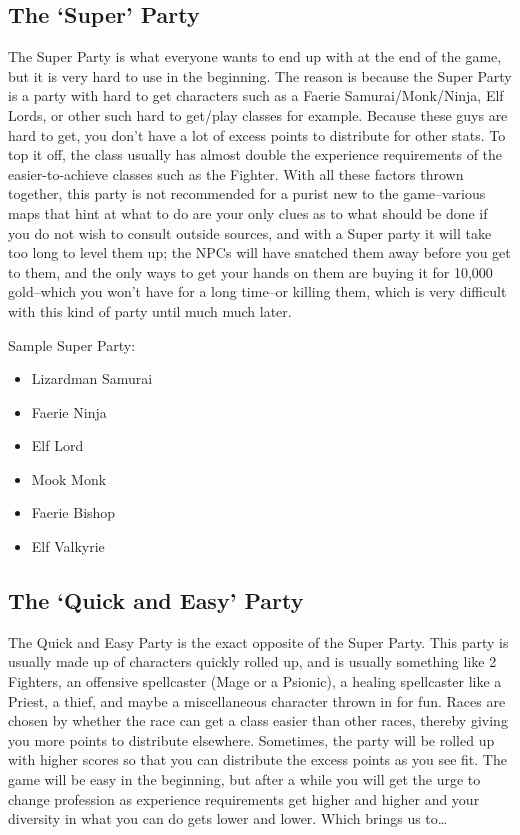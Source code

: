 \documentclass[12pt]{article}
\providecommand{\tightlist}{%
  \setlength{\itemsep}{0pt}\setlength{\parskip}{0pt}}
\begin{document}
\subsection{\texorpdfstring{The `Super'
Party}{The Super Party}}\label{the-super-party}

The Super Party is what everyone wants to end up with at the end of the game,
but it is very hard to use in the beginning. The reason is because the Super
Party is a party with hard to get characters such as a Faerie
Samurai\fshyp{}Monk\fshyp{}Ninja, Elf Lords, or other such hard to get/play
classes for example. Because these guys are hard to get, you don't have a lot
of excess points to distribute for other stats. To top it off, the class
usually has almost double the experience requirements of the
easier-to-achieve classes such as the Fighter. With all these factors thrown
together, this party is not recommended for a purist new to the game--various
maps that hint at what to do are your only clues as to what should be done if
you do not wish to consult outside sources, and with a Super party it will
take too long to level them up; the NPCs will have snatched them away before
you get to them, and the only ways to get your hands on them are buying it
for 10,000 gold--which you won't have for a long time--or killing them, which
is very difficult with this kind of party until much much later.

Sample Super Party:

\begin{itemize}
\tightlist
\item
  Lizardman Samurai
\item
  Faerie Ninja
\item
  Elf Lord
\item
  Mook Monk
\item
  Faerie Bishop
\item
  Elf Valkyrie
\end{itemize}

\subsection{\texorpdfstring{The `Quick and Easy'
Party}{The Quick and Easy Party}}\label{the-quick-and-easy-party}

The Quick and Easy Party is the exact opposite of the Super Party. This
party is usually made up of characters quickly rolled up, and is usually
something like 2 Fighters, an offensive spellcaster (Mage or a Psionic),
a healing spellcaster like a Priest, a thief, and maybe a miscellaneous
character thrown in for fun. Races are chosen by whether the race can
get a class easier than other races, thereby giving you more points to
distribute elsewhere. Sometimes, the party will be rolled up with higher
scores so that you can distribute the excess points as you see fit. The
game will be easy in the beginning, but after a while you will get the
urge to change profession as experience requirements get higher and
higher and your diversity in what you can do gets lower and lower. Which
brings us to\ldots{}
\end{document}
